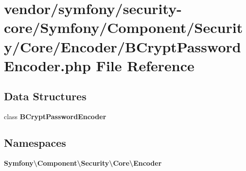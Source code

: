 \section{vendor/symfony/security-\/core/\+Symfony/\+Component/\+Security/\+Core/\+Encoder/\+B\+Crypt\+Password\+Encoder.php File Reference}
\label{_b_crypt_password_encoder_8php}
\subsection*{Data Structures}
\begin{DoxyCompactItemize}
\item 
class {\bf B\+Crypt\+Password\+Encoder}
\end{DoxyCompactItemize}
\subsection*{Namespaces}
\begin{DoxyCompactItemize}
\item 
 {\bf Symfony\textbackslash{}\+Component\textbackslash{}\+Security\textbackslash{}\+Core\textbackslash{}\+Encoder}
\end{DoxyCompactItemize}
